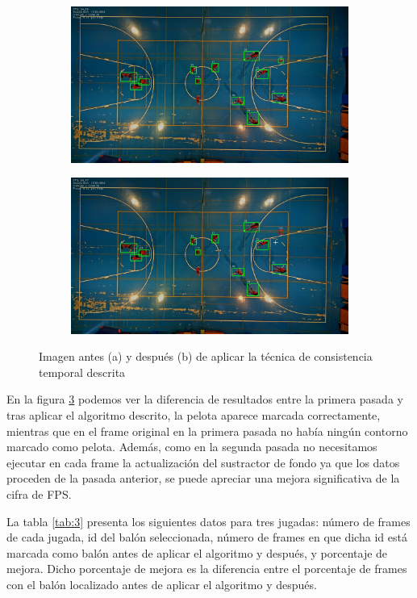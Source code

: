 \begin{figure}
\begin{subfigure}{.5\textwidth}
  \centering
  \includegraphics[width=.9\linewidth]{images/noconsistencia}
  \caption { }
  \label{fig:consa}
\end{subfigure}%
\begin{subfigure}{.5\textwidth}
  \centering
  \includegraphics[width=.9\linewidth]{images/consistencia}
  \caption { }
  \label{fig:consb}
\end{subfigure}
\caption{Imagen antes (a) y después (b) de aplicar la técnica de consistencia temporal descrita}
\label{fig:cons}
\end{figure}

En la figura \ref{fig:cons} podemos ver la diferencia de resultados entre la primera pasada y tras aplicar el algoritmo descrito, la pelota aparece marcada correctamente, mientras que en el frame original en la primera pasada no había ningún contorno marcado como pelota. Además, como en la segunda pasada no necesitamos ejecutar en cada frame la actualización del sustractor de fondo ya que los datos proceden de la pasada anterior, se puede apreciar una mejora significativa de la cifra de FPS.

La tabla \ref{tab:3} presenta los siguientes datos para tres jugadas: número de frames de cada jugada, id del balón seleccionada, número de frames en que dicha id está marcada como balón antes de aplicar el algoritmo y después, y porcentaje de mejora. Dicho porcentaje de mejora es la diferencia entre el porcentaje de frames con el balón localizado antes de aplicar el algoritmo y después.


